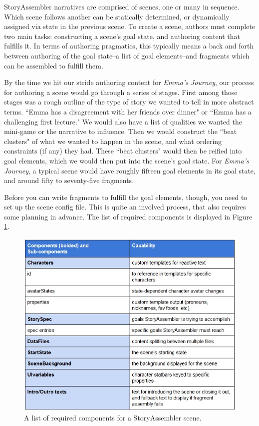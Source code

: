 StoryAssembler narratives are comprised of scenes, one or many in sequence. Which scene follows another can be statically determined, or dynamically assigned via state in the previous scene. To create a scene, authors must complete two main tasks: constructing a scene's goal state, and authoring content that fulfills it. In terms of authoring pragmatics, this typically means a back and forth between authoring of the goal state--a list of goal elements--and fragments which can be assembled to fulfill them.

By the time we hit our stride authoring content for \textit{Emma's Journey}, our process for authoring a scene would go through a series of stages. First among those stages was a rough outline of the type of story we wanted to tell in more abstract terms. ``Emma has a disagreement with her friends over dinner" or ``Emma has a challenging first lecture." We would also have a list of qualities we wanted the mini-game or the narrative to influence. Then we would construct the ``beat clusters" of what we wanted to happen in the scene, and what ordering constraints (if any) they had. These ``beat clusters" would then be reified into goal elements, which we would then put into the scene's goal state. For \textit{Emma's Journey}, a typical scene would have roughly fifteen goal elements in its goal state, and around fifty to seventy-five fragments.

Before you can write fragments to fulfill the goal elements, though, you need to set up the scene config file. This is quite an involved process, that also requires some planning in advance. The list of required components is displayed in Figure \ref{fig:scene-components}.


\begin{figure}
    \centering
    \includegraphics[width=\textwidth]{figures/3-StoryAssembler/scene-components.jpg}
    \caption{A list of required components for a StoryAssembler scene.}
    \label{fig:scene-components}
\end{figure}

